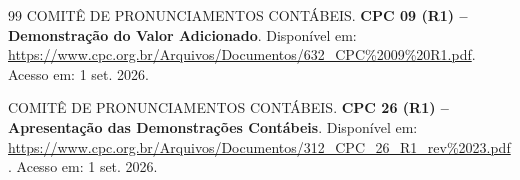 \documentclass[11pt,a4paper]{article}
\begin{document}
\begin{thebibliography}{99}
COMITÊ DE PRONUNCIAMENTOS CONTÁBEIS. \textbf{CPC 09 (R1) -- Demonstração do Valor Adicionado}. Disponível em: \url{https://www.cpc.org.br/Arquivos/Documentos/632_CPC%2009%20R1.pdf}. Acesso em: 1 set. 2026.

COMITÊ DE PRONUNCIAMENTOS CONTÁBEIS. \textbf{CPC 26 (R1) -- Apresentação das Demonstrações Contábeis}. Disponível em: \url{https://www.cpc.org.br/Arquivos/Documentos/312_CPC_26_R1_rev%2023.pdf}. Acesso em: 1 set. 2026.

\end{thebibliography}
\normalsize
\end{document}
